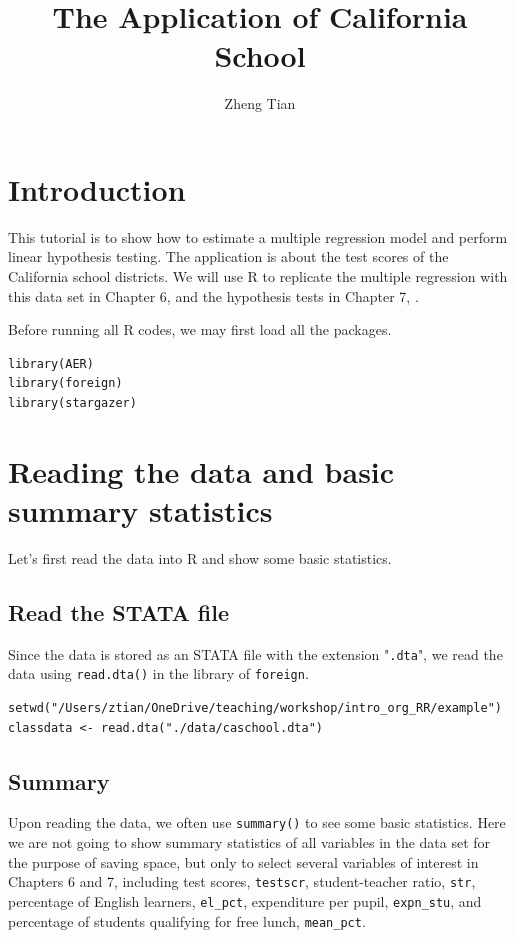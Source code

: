 \documentclass[11pt]{article}
\author{Zheng Tian}
\date{}
\title{The Application of California School}
\begin{document}
\maketitle


\section{Introduction}
\label{sec:orgc9273b5}
This tutorial is to show how to estimate a multiple regression model
and perform linear hypothesis testing. The application is about the
test scores of the California school districts. We will use R to
replicate the multiple regression with this data set in Chapter 6, and
the hypothesis tests in Chapter 7, \citet{StockWatson2011}.

Before running all R codes, we may first load all the packages.
\begin{verbatim}
library(AER)
library(foreign)
library(stargazer)
\end{verbatim}


\section{Reading the data and basic summary statistics}
\label{sec:org6739abc}
Let's first read the data into R and show some basic statistics.
\subsection*{Read the STATA file}
\label{sec:org2fc340c}
Since the data is stored as an STATA file with the extension
  "\texttt{.dta}", we read the data using \texttt{read.dta()} in the library of
  \texttt{foreign}.

\begin{verbatim}
setwd("/Users/ztian/OneDrive/teaching/workshop/intro_org_RR/example")
classdata <- read.dta("./data/caschool.dta")
\end{verbatim}

\subsection*{Summary}
\label{sec:org0bfec33}
Upon reading the data, we often use \texttt{summary()} to see some basic
statistics. Here we are not going to show summary statistics of all
variables in the data set for the purpose of saving space, but only to
select several variables of interest in Chapters 6 and 7, including
test scores, \texttt{testscr}, student-teacher ratio, \texttt{str}, percentage of
English learners, \texttt{el\_pct}, expenditure per pupil, \texttt{expn\_stu}, and
percentage of students qualifying for free lunch, \texttt{mean\_pct}.
\end{document}
